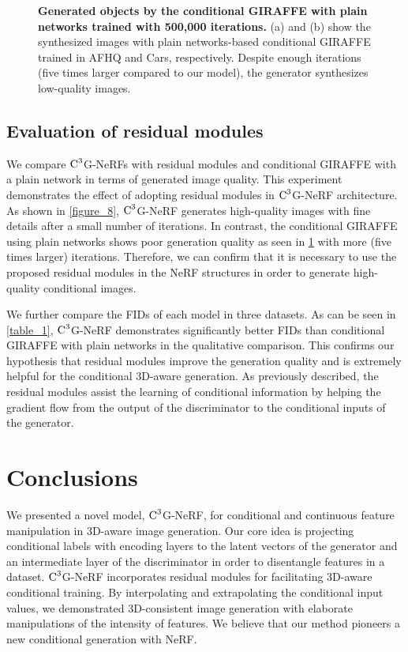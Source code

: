 \documentclass[nohyperref]{article}
\theoremstyle{plain}
\theoremstyle{definition}
\theoremstyle{remark}
\begin{document}
\begin{figure}[h]
\vskip 0.2in
\begin{center}
\vskip -0.15in
\caption{\textbf{Generated objects by the conditional GIRAFFE with plain networks trained with 500,000 iterations.} (a) and (b) show the synthesized images with plain networks-based conditional GIRAFFE trained in AFHQ and Cars, respectively. Despite enough iterations (five times larger compared to our model), the generator synthesizes low-quality images.}
\label{figure_9}
\end{center}
\vskip -0.2in
\end{figure}



\subsection{Evaluation of residual modules}
We compare $\textnormal{C}^{3}$G-NeRFs with residual modules and conditional GIRAFFE with a plain network in terms of generated image quality. This experiment demonstrates the effect of adopting residual modules \cite{he2016deep, mescheder2018training} in $\textnormal{C}^{3}$G-NeRF architecture. As shown in \cref{figure_8}, $\textnormal{C}^{3}$G-NeRF generates high-quality images with fine details after a small number of iterations. In contrast, the conditional GIRAFFE using plain networks shows poor generation quality as seen in \cref{figure_9} with more (five times larger) iterations. Therefore, we can confirm that it is necessary to use the proposed residual modules in the NeRF structures in order to generate high-quality conditional images. 

We further compare the FIDs of each model in three datasets. As can be seen in \cref{table_1}, $\textnormal{C}^{3}$G-NeRF demonstrates significantly better FIDs than conditional GIRAFFE with plain networks in the qualitative comparison. This confirms our hypothesis that residual modules improve the generation quality and is extremely helpful for the conditional 3D-aware generation. As previously described, the residual modules assist the learning of conditional information by helping the gradient flow from the output of the discriminator to the conditional inputs of the generator.


\section{Conclusions}
We presented a novel model, $\textnormal{C}^{3}$G-NeRF, for conditional and continuous feature manipulation in 3D-aware image generation. Our core idea is projecting conditional labels with encoding layers to the latent vectors of the generator and an intermediate layer of the discriminator in order to disentangle features in a dataset. $\textnormal{C}^{3}$G-NeRF incorporates residual modules for facilitating 3D-aware conditional training. By interpolating and extrapolating the conditional input values, we demonstrated 3D-consistent image generation with elaborate manipulations of the intensity of features. We believe that our method pioneers a new conditional generation with NeRF. 
\end{document}
